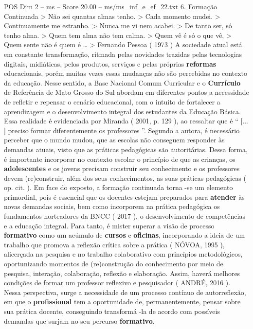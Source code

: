 \begin{textsample}{POS Dim 2 – ms – Score 20.00 – ms/ms\_inf\_e\_ef\_22.txt}  \label{ex:f2_pos_048}
6.
Formação Continuada > Não sei quantas almas tenho. > Cada momento mudei. > Continuamente me estranho. > Nunca me vi nem acabei. > De tanto ser, só tenho alma. > Quem tem alma não tem calma. > Quem vê é só o que vê, > Quem sente não é quem é … > Fernando Pessoa ( 1973 ) A sociedade atual está em constante transformação, ritmada pelas novidades trazidas pelas tecnologias digitais, midiáticas, pelos produtos, serviços e pelas próprias \textbf{reformas} educacionais, porém muitas vezes essas mudanças não são percebidas no contexto da educação.
Nesse sentido, a Base Nacional Comum Curricular e o \textbf{Currículo} de Referência de Mato Grosso do Sul abordam em diferentes pontos a necessidade de refletir e repensar o cenário educacional, com o intuito de fortalecer a aprendizagem e o desenvolvimento integral dos estudantes da Educação Básica.
Essa realidade é evidenciada por Miranda ( 2001, p. 129 ), ao ressaltar que é “ [... ] preciso formar diferentemente os professores ”.
Segundo a autora, é necessário perceber que o mundo mudou, que as escolas não conseguem responder às demandas atuais, visto que as práticas pedagógicas são autoritárias.
Dessa forma, é importante incorporar no contexto escolar o princípio de que as crianças, os \textbf{adolescentes} e os jovens precisam construir seu conhecimento e os professores devem (re)construir, além dos seus conhecimentos, as suas práticas pedagógicas ( op. cit. ).
Em face do exposto, a formação continuada torna -se um elemento primordial, pois é essencial que os docentes estejam preparados para \textbf{atender} às novas demandas sociais, bem como incorporem na prática pedagógica os fundamentos norteadores da BNCC ( 2017 ), o desenvolvimento de competências e a educação integral.
Para tanto, é mister superar a visão de processo \textbf{formativo} como um acúmulo de \textbf{cursos} e \textbf{oficinas}, incorporando a ideia de um trabalho que promova a reflexão crítica sobre a prática ( NÓVOA, 1995 ), alicerçada na pesquisa e no trabalho colaborativo com princípios metodológicos, oportunizando momentos de (re)construção do conhecimento por meio de pesquisa, interação, colaboração, reflexão e elaboração.
Assim, haverá melhores condições de formar um professor reflexivo e pesquisador ( ANDRÉ, 2016 ).
Nessa perspectiva, surge a necessidade de um processo contínuo de autorreflexão, em que o \textbf{profissional} tem a oportunidade de, permanentemente, pensar sobre sua prática docente, conseguindo transformá -la de acordo com possíveis demandas que surjam no seu percurso \textbf{formativo}.

\end{textsample}
